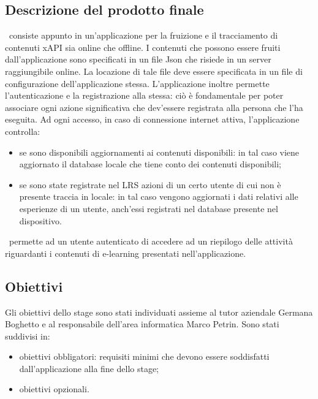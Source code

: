 \documentclass[../Tesi.tex]{subfiles}
\begin{document}
	\subsection{Descrizione del prodotto finale}
	\app\ consiste appunto in un'applicazione per la fruizione e il tracciamento di contenuti xAPI sia online che offline. I contenuti che possono essere fruiti dall'applicazione sono specificati in un file Json che risiede in un server raggiungibile online. La locazione di tale file deve essere specificata in un file di configurazione dell'applicazione stessa. L'applicazione inoltre permette l'autenticazione e la registrazione alla stessa: ciò è fondamentale per poter associare ogni azione significativa che dev'essere registrata alla persona che l'ha eseguita. Ad ogni accesso, in caso di connessione internet attiva, l'applicazione controlla:
	\begin{itemize}
		\item se sono disponibili aggiornamenti ai contenuti disponibili: in tal caso viene aggiornato il database locale che tiene conto dei contenuti disponibili;
		\item se sono state registrate nel LRS azioni di un certo utente di cui non è presente traccia in locale: in tal caso vengono aggiornati i dati relativi alle esperienze di un utente, anch'essi registrati nel database presente nel dispositivo.
	\end{itemize} 
	\app\ permette ad un utente autenticato di accedere ad un riepilogo delle attività riguardanti i contenuti di e-learning presentati nell'applicazione. 

	\subsection{Obiettivi}
		Gli obiettivi dello stage sono stati individuati assieme al tutor aziendale Germana Boghetto e al responsabile dell'area informatica Marco Petrin. Sono stati suddivisi in:
		\begin{itemize}
			\item obiettivi obbligatori: requisiti minimi che devono essere soddisfatti dall'applicazione alla fine dello stage;
			\item obiettivi opzionali.
		\end{itemize}
\end{document}
